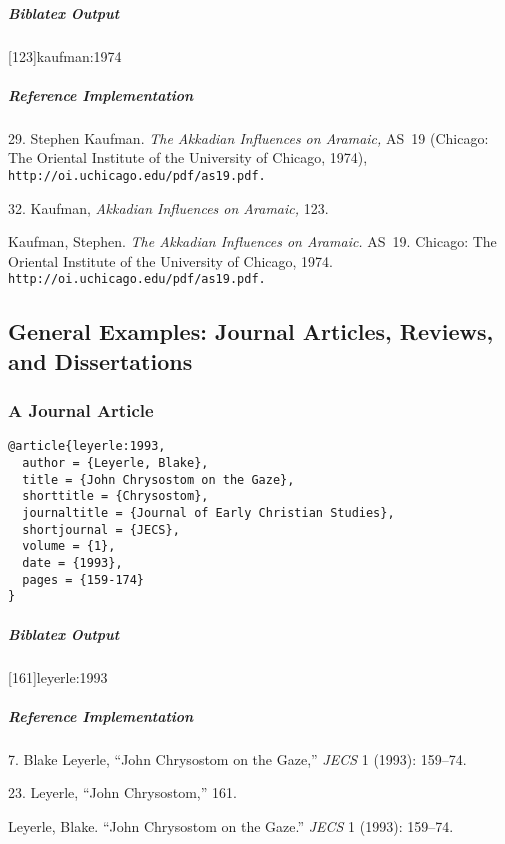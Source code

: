 \documentclass[a4paper]{article}
\newenvironment{biboutput}{%
  \subparagraph{Biblatex Output}
}{\color{black}}
\newenvironment{refimp}{%
  \subparagraph{Reference Implementation}
  \color{reference-colour}
  \rm
}{\par\color{black}}
\begin{document}
\begin{biboutput}
  [123]{kaufman:1974}
\end{biboutput}

\begin{refimp}
  \hspace*{\bibindent}29. Stephen Kaufman. \emph{The Akkadian Influences on
  Aramaic,} AS~19 (Chicago: The Oriental Institute of the University of
  Chicago, 1974), \nolinkurl{http://oi.uchicago.edu/pdf/as19.pdf.}

  \hspace*{\bibindent}32. Kaufman, \emph{Akkadian Influences on Aramaic,} 123.

  \hangindent\bibindent Kaufman, Stephen. \emph{The Akkadian Influences on
  Aramaic.} AS~19. Chicago: The Oriental Institute of the University of
  Chicago, 1974. \nolinkurl{http://oi.uchicago.edu/pdf/as19.pdf.}

\end{refimp}

\subsection{General Examples: Journal Articles, Reviews, and Dissertations}

\subsubsection{A Journal Article}

\begin{lstlisting}
@article{leyerle:1993,
  author = {Leyerle, Blake},
  title = {John Chrysostom on the Gaze},
  shorttitle = {Chrysostom},
  journaltitle = {Journal of Early Christian Studies},
  shortjournal = {JECS},
  volume = {1},
  date = {1993},
  pages = {159-174}
}
\end{lstlisting}  

\begin{biboutput}
  [161]{leyerle:1993}
\end{biboutput}

\begin{refimp}
  \hspace*{\bibindent}7. Blake Leyerle, “John Chrysostom on the Gaze,”
  \emph{JECS} 1 (1993): 159–74.

  \hspace*{\bibindent}23. Leyerle, “John Chrysostom,” 161.

  \hangindent\bibindent Leyerle, Blake. “John Chrysostom on the Gaze.”
  \emph{JECS} 1 (1993): 159–74.

\end{refimp}
\end{document}
